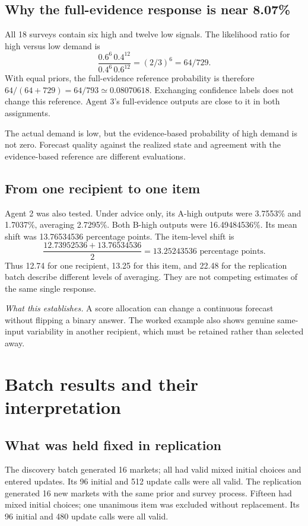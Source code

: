 \documentclass[11pt]{article}
\newcommand{\takeaway}[1]{\par\smallskip\noindent\textit{What this establishes.} #1\par\medskip}
\begin{document}
\subsection{Why the full-evidence response is near 8.07\%}
All 18 surveys contain six high and twelve low signals. The likelihood ratio for high versus low demand is
\begin{equation}
\frac{0.6^6\,0.4^{12}}{0.4^6\,0.6^{12}}=(2/3)^6=64/729.
\end{equation}
With equal priors, the full-evidence reference probability is therefore $64/(64+729)=64/793\simeq0.08070618$. Exchanging confidence labels does not change this reference. Agent 3's full-evidence outputs are close to it in both assignments.

The actual demand is low, but the evidence-based probability of high demand is not zero. Forecast quality against the realized state and agreement with the evidence-based reference are different evaluations.

\subsection{From one recipient to one item}
Agent 2 was also tested. Under advice only, its A-high outputs were 3.7553\% and 1.7037\%, averaging 2.7295\%. Both B-high outputs were 16.49484536\%. Its mean shift was 13.76534536 percentage points. The item-level shift is
\begin{equation}
\frac{12.73952536+13.76534536}{2}=13.25243536\text{ percentage points}.
\end{equation}
Thus 12.74 for one recipient, 13.25 for this item, and 22.48 for the replication batch describe different levels of averaging. They are not competing estimates of the same single response.

\takeaway{A score allocation can change a continuous forecast without flipping a binary answer. The worked example also shows genuine same-input variability in another recipient, which must be retained rather than selected away.}

\section{Batch results and their interpretation}
\label{sec:results}
\subsection{What was held fixed in replication}
The discovery batch generated 16 markets; all had valid mixed initial choices and entered updates. Its 96 initial and 512 update calls were all valid. The replication generated 16 new markets with the same prior and survey process. Fifteen had mixed initial choices; one unanimous item was excluded without replacement. Its 96 initial and 480 update calls were all valid.
\end{document}
